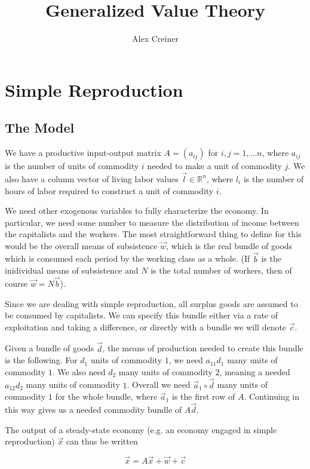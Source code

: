 \documentclass{article}
\title{Generalized Value Theory}
\author{Alex Creiner}
\theoremstyle{definition}
\begin{document}
\maketitle
\section{Simple Reproduction}

\subsection{The Model}

We have a productive input-output matrix $A = (a_{ij})$ for $i,j=1,\ldots n$, where $a_{ij}$ is the number of units of commodity $i$ needed to make a unit of commodity $j$. We also have a column vector of living labor values $\vec{l} \in \mathbb{R}^n$, where $l_{i}$ is the number of hours of labor required to construct a unit of commodity $i$. 

We need other exogenous variables to fully characterize the economy. In particular, we need some number to measure the distribution of income between the capitalists and the workers. The most straightforward thing to define for this would be the overall means of subsistence $\vec{w}$, which is the real bundle of goods which is consumed each period by the working class as a whole. (If $\vec{b}$ is the inidividual means of subsistence and $N$ is the total number of workers, then of course $\vec{w}= N\vec{b}$). 

Since we are dealing with simple reproduction, all surplus goods are assumed to be consumed by capitalists. We can specify this bundle either via a rate of exploitation and taking a difference, or directly with a bundle we will denote $\vec{c}$. 

Given a bundle of goods $\vec{d}$, the means of production needed to create this bundle is the following. For $d_1$ units of commodity $1$, we need $a_{11}d_1$ many units of commodity $1$. We also need $d_2$ many units of commodity $2$, meaning a needed $a_{12}d_2$ many units of commodity $1$. Overall we need $\vec{a}_1\circ \vec{d}$ many units of commodity $1$ for the whole bundle, where $\vec{a}_1$ is the first row of $A$. Continuing in this way gives us a needed commodity bundle of $A\vec{d}$. 

The output of a steady-state economy (e.g. an economy engaged in simple reproduction) $\vec{x}$ can thus be written 

\begin{equation}
    \vec{x} = A\vec{x}+\vec{w}+\vec{c}
\end{equation}
\end{document}
